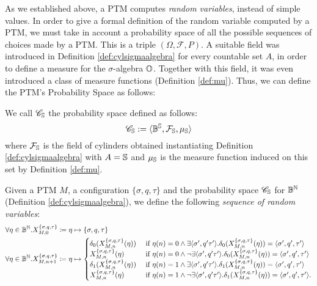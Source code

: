 As we established above, a PTM computes
\emph{random variables}, instead of simple values. In order to
give a formal definition of the random variable computed by a PTM, we
must take in account a probability space of all the possible sequences
of choices made by a PTM. This is a triple $(\Omega, \mathcal F, P)$.
A suitable field was introduced in Definition
\ref{def:cylsigmaalgebra} for every countable set $A$, in order to define a measure
for the $\sigma$-algebra $\mathbb{O}$. Together with this field,
it was even introduced a class of measure functions (Definition \ref{def:mu}).
Thus, we can define the PTM's Probability Space as follows:

\begin{defn}
  We call $\mathscr C_{\mathbb{S}}$ the probability space defined as follows:
  $$
  \mathscr C_{\mathbb{S}} := \langle \mathbb{B}^{\mathbb{S}}, \mathcal F_{\mathbb{S}}, \mu_{\mathbb{S}}\rangle
  $$
  where $\mathcal F_{\mathbb{S}}$ is the field of cylinders obtained instantiating
  Definition \ref{def:cylsigmaalgebra} with $A=\mathbb{S}$ and $\mu_{\mathbb{S}}$
  is the measure function induced on this set by Definition \ref{def:mu}.
\end{defn}



\begin{defn}
  \label{def:ptmX}
Given a PTM  $M$, a configuration $\{\sigma, q, \tau\}$
and the probability space $\mathscr C_{\mathbb{S}}$ for
$\mathbb{B}^{\mathbb{N}}$ (Definition \ref{def:cylsigmaalgebra}), we define the following
\emph{sequence of random variables}:
%
\begin{align*}
\forall \eta \in \mathbb{B}^{\mathbb{N}}. X_{M, 0}^{\{\sigma, q, \tau\}} &\coloneqq \eta \mapsto \{\sigma, q, \tau\}\\
\forall \eta \in \mathbb{B}^{\mathbb{N}}. X_{M, n+1}^{\{\sigma, q, \tau\}} & \coloneqq \eta \mapsto \begin{cases}
\delta_0(X_{M, n}^{\{\sigma, q, \tau\}}(\eta)) & \text{ if } \eta(n)=0 \land \exists \langle \sigma', q' \tau'\rangle. \delta_0(X_{M, n}^{\{\sigma, q, \tau\}}(\eta))=\langle \sigma', q', \tau'\rangle\\
X_{M, n}^{\{\sigma, q, \tau\}}(\eta) & \text{ if } \eta(n)=0 \land \lnot\exists \langle \sigma', q' \tau'\rangle. \delta_0(X_{M, n}^{\{\sigma, q, \tau\}}(\eta))=\langle \sigma', q', \tau'\rangle\\
\delta_1(X_{M, n}^{\{\sigma, q, \tau\}}(\eta)) & \text{ if } \eta(n)=1 \land \exists \langle \sigma', q' \tau'\rangle. \delta_1(X_{M, n}^{\{\sigma, q, \tau\}}(\eta))=\langle \sigma', q', \tau'\rangle\\
X_{M, n}^{\{\sigma, q, \tau\}}(\eta) & \text{ if } \eta(n)=1 \land \lnot\exists \langle \sigma', q' \tau'\rangle. \delta_1(X_{M, n}^{\{\sigma, q, \tau\}}(\eta))=\langle \sigma', q', \tau'\rangle.
\end{cases}
\end{align*}
\end{defn}


